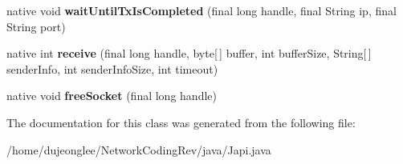 \begin{DoxyCompactItemize}
\item 
native void {\bfseries wait\+Until\+Tx\+Is\+Completed} (final long handle, final String ip, final String port)\hypertarget{classdujeonglee_1_1networkcoding_1_1_japi_a4f251fcffb2e0acfcef5f48caaccaf1f}{}\label{classdujeonglee_1_1networkcoding_1_1_japi_a4f251fcffb2e0acfcef5f48caaccaf1f}

\item 
native int {\bfseries receive} (final long handle, byte\mbox{[}$\,$\mbox{]} buffer, int buffer\+Size, String\mbox{[}$\,$\mbox{]} sender\+Info, int sender\+Info\+Size, int timeout)\hypertarget{classdujeonglee_1_1networkcoding_1_1_japi_af21926239e440e87a5c6d2f1780931d5}{}\label{classdujeonglee_1_1networkcoding_1_1_japi_af21926239e440e87a5c6d2f1780931d5}

\item 
native void {\bfseries free\+Socket} (final long handle)\hypertarget{classdujeonglee_1_1networkcoding_1_1_japi_a60c8916a2d9c42c83cbb4af3ca813201}{}\label{classdujeonglee_1_1networkcoding_1_1_japi_a60c8916a2d9c42c83cbb4af3ca813201}

\end{DoxyCompactItemize}


The documentation for this class was generated from the following file\+:\begin{DoxyCompactItemize}
\item 
/home/dujeonglee/\+Network\+Coding\+Rev/java/Japi.\+java\end{DoxyCompactItemize}
